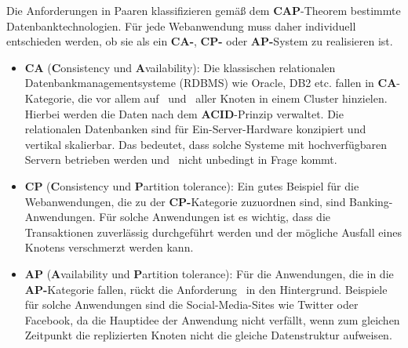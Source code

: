 Die Anforderungen in Paaren klassifizieren gemäß dem \textbf{CAP}-Theorem bestimmte Datenbanktechnologien. Für jede Webanwendung muss daher individuell entschieden werden, ob sie als ein \textbf{CA-}, \textbf{CP-} oder \textbf{AP-}System zu realisieren ist.
\begin{itemize}
\item \textbf{CA} (\textbf{C}onsistency und \textbf{A}vailability): Die klassischen relationalen Datenbankmanagementsysteme (RDBMS) wie Oracle, DB2 etc. fallen in \textbf{CA}-Kategorie, die vor allem auf  \Cap\ und \cAp\ aller Knoten in einem Cluster hinzielen. Hierbei werden die Daten nach dem \textbf{ACID}-Prinzip verwaltet. Die relationalen Datenbanken sind für Ein-Server-Hardware konzipiert und vertikal skalierbar. Das bedeutet, dass solche Systeme mit hochverfügbaren Servern betrieben werden und \caP\  nicht unbedingt in Frage kommt.


\item \textbf{CP} (\textbf{C}onsistency und \textbf{P}artition tolerance): Ein gutes Beispiel für die Webanwendungen, die zu der \textbf{CP-}Kategorie zuzuordnen sind, sind Banking-Anwendungen. Für solche Anwendungen ist es wichtig, dass die Transaktionen zuverlässig durchgeführt werden und der mögliche Ausfall eines Knotens verschmerzt werden kann. 
%

\item \textbf{AP} (\textbf{A}vailability und \textbf{P}artition tolerance): Für die Anwendungen, die in die \textbf{AP-}Kategorie fallen, rückt die Anforderung \Cap\ in den Hintergrund. Beispiele für solche Anwendungen sind die Social-Media-Sites wie Twitter oder Facebook, da die Hauptidee der Anwendung nicht verfällt, wenn zum gleichen Zeitpunkt die replizierten Knoten nicht die gleiche Datenstruktur aufweisen. 
\end{itemize}
